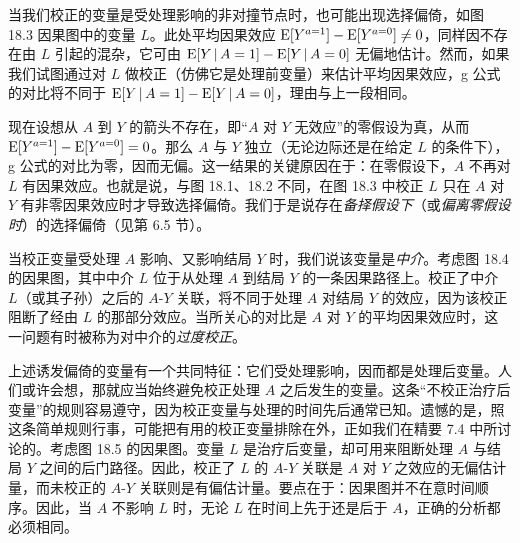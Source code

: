 当我们校正的变量是受处理影响的非对撞节点时，也可能出现选择偏倚，如图 18.3 因果图中的变量 $L$。此处平均因果效应 $\mathrm{E}[Y^{a=1}]-\mathrm{E}[Y^{a=0}]\neq 0$，同样因不存在由 $L$ 引起的混杂，它可由 $\mathrm{E}[Y\,|\, A=1]-\mathrm{E}[Y\,|\, A=0]$ 无偏地估计。然而，如果我们试图通过对 $L$ 做校正（仿佛它是处理前变量）来估计平均因果效应，g 公式的对比将不同于 $\mathrm{E}[Y\,|\, A=1]-\mathrm{E}[Y\,|\, A=0]$，理由与上一段相同。

现在设想从 $A$ 到 $Y$ 的箭头不存在，即“$A$ 对 $Y$ 无效应”的零假设为真，从而 $\mathrm{E}[Y^{a=1}]-\mathrm{E}[Y^{a=0}]=0$。那么 $A$ 与 $Y$ 独立（无论边际还是在给定 $L$ 的条件下），g 公式的对比为零，因而无偏。这一结果的关键原因在于：在零假设下，$A$ 不再对 $L$ 有因果效应。也就是说，与图 18.1、18.2 不同，在图 18.3 中校正 $L$ 只在 $A$ 对 $Y$ 有非零因果效应时才导致选择偏倚。我们于是说存在\emph{备择假设下}（或\emph{偏离零假设时}）的选择偏倚（见第 6.5 节）。

当校正变量受处理 $A$ 影响、又影响结局 $Y$ 时，我们说该变量是\emph{中介}。考虑图 18.4 的因果图，其中中介 $L$ 位于从处理 $A$ 到结局 $Y$ 的一条因果路径上。校正了中介 $L$（或其子孙）之后的 $A$-$Y$ 关联，将不同于处理 $A$ 对结局 $Y$ 的效应，因为该校正阻断了经由 $L$ 的那部分效应。当所关心的对比是 $A$ 对 $Y$ 的平均因果效应时，这一问题有时被称为对中介的\emph{过度校正}。

\begin{figure}[htbp]
\centering
{}
\caption{}
\label{fig:18.4}
\end{figure}

上述诱发偏倚的变量有一个共同特征：它们受处理影响，因而都是处理后变量。人们或许会想，那就应当始终避免校正处理 $A$ 之后发生的变量。这条“不校正治疗后变量”的规则容易遵守，因为校正变量与处理的时间先后通常已知。遗憾的是，照这条简单规则行事，可能把有用的校正变量排除在外，正如我们在精要 7.4 中所讨论的。考虑图 18.5 的因果图。变量 $L$ 是治疗后变量，却可用来阻断处理 $A$ 与结局 $Y$ 之间的后门路径。因此，校正了 $L$ 的 $A$-$Y$ 关联是 $A$ 对 $Y$ 之效应的无偏估计量，而未校正的 $A$-$Y$ 关联则是有偏估计量。要点在于：因果图并不在意时间顺序。因此，当 $A$ 不影响 $L$ 时，无论 $L$ 在时间上先于还是后于 $A$，正确的分析都必须相同。

